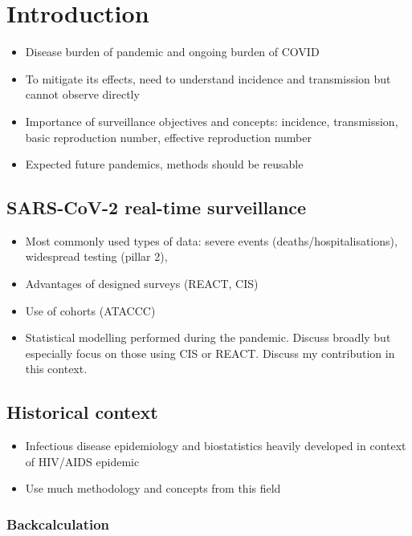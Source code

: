 \documentclass[thesis.tex]{subfiles}
\begin{document}
\chapter{Introduction} \label{intro}

\begin{itemize}
    \item Disease burden of pandemic and ongoing burden of COVID
    \item To mitigate its effects, need to understand incidence and transmission but cannot observe directly
    \item Importance of surveillance objectives and concepts: incidence, transmission, basic reproduction number, effective reproduction number
    \item Expected future pandemics, methods should be reusable
\end{itemize}

\section{SARS-CoV-2 real-time surveillance}

\begin{itemize}
    \item Most commonly used types of data: severe events (deaths/hospitalisations), widespread testing (pillar 2), 
    \item Advantages of designed surveys (REACT, CIS)
    \item Use of cohorts (ATACCC)
    \item Statistical modelling performed during the pandemic. Discuss broadly but especially focus on those using CIS or REACT. Discuss my contribution in this context.
\end{itemize}


\section{Historical context}

\begin{itemize}
    \item Infectious disease epidemiology and biostatistics heavily developed in context of HIV/AIDS epidemic
    \item Use much methodology and concepts from this field
\end{itemize}

\subsection{Backcalculation}
\end{document}
